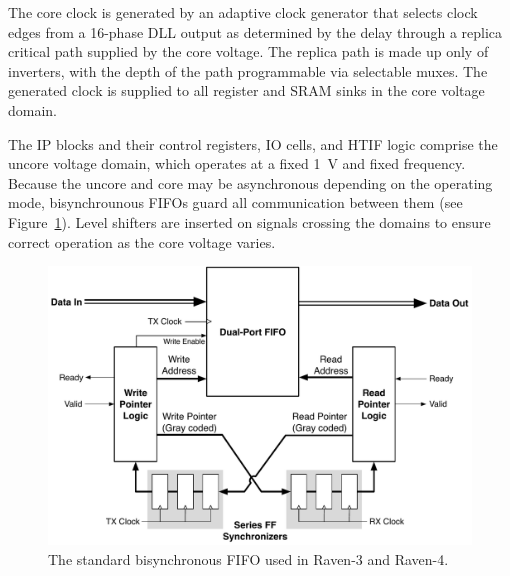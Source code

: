 \documentclass[graybox]{svmult}
\begin{document}
The core clock is generated by an adaptive clock generator that selects clock edges from a 16-phase DLL output as determined by the delay through a replica critical path supplied by the core voltage.
The replica path is made up only of inverters, with the depth of the path programmable via selectable muxes.
The generated clock is supplied to all register and SRAM sinks in the core voltage domain.

The IP blocks and their control registers, IO cells, and HTIF logic comprise the uncore voltage domain, which operates at a fixed \SI{1}{\volt} and fixed frequency.
Because the uncore and core may be asynchronous depending on the operating mode, bisynchrounous FIFOs guard all communication between them (see Figure~\ref{fig:5-bisync-fifo}).
Level shifters are inserted on signals crossing the domains to ensure correct operation as the core voltage varies.

\begin{figure}
  \centering
  \includegraphics[width=\textwidth]{5-bisync-fifo}
  \caption{The standard bisynchronous FIFO used in Raven-3 and Raven-4.}
  \label{fig:5-bisync-fifo}
\end{figure}
\end{document}
